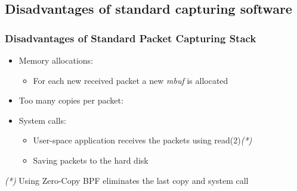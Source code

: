 \subsection*{Disadvantages of standard capturing software}
\begin{frame}
\frametitle{Disadvantages of Standard Packet Capturing Stack}
\begin{itemize}
	\item<2-> Memory allocations:
		\begin{itemize}
			\item<2-> For each new received packet a new \emph{mbuf} 
				is allocated\newline
		\end{itemize}


	\item<3-> Too many copies per packet:
		\begin{itemize}
		\end{itemize}

	\item<4-> System calls:
		\begin{itemize}
			\item<4-> User-space application receives the packets using read(2)\emph{(*)}
			\item<4-> Saving packets to the hard disk\newline
		\end{itemize}

\end{itemize}
\begin{tiny}
\emph{(*)} Using Zero-Copy BPF eliminates the last copy and system call
\end{tiny}
\end{frame}
